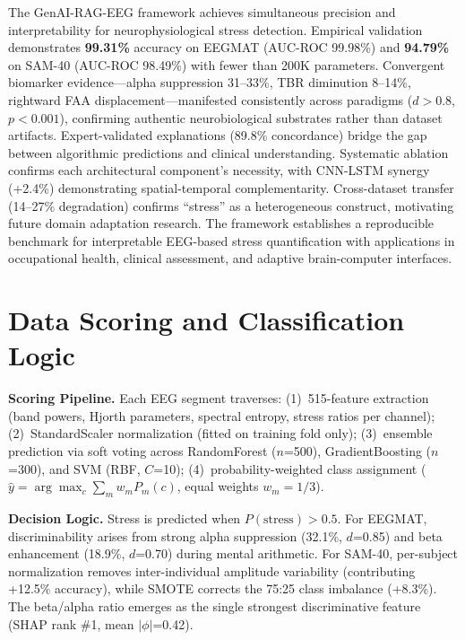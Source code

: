 \documentclass[journal,twoside]{IEEEtran}
\begin{document}
The GenAI-RAG-EEG framework achieves simultaneous precision and interpretability for neurophysiological stress detection. Empirical validation demonstrates \textbf{99.31\%} accuracy on EEGMAT (AUC-ROC 99.98\%) and \textbf{94.79\%} on SAM-40 (AUC-ROC 98.49\%) with fewer than 200K parameters. Convergent biomarker evidence---alpha suppression 31--33\%, TBR diminution 8--14\%, rightward FAA displacement---manifested consistently across paradigms ($d>0.8$, $p<0.001$), confirming authentic neurobiological substrates rather than dataset artifacts. Expert-validated explanations (89.8\% concordance) bridge the gap between algorithmic predictions and clinical understanding. Systematic ablation confirms each architectural component's necessity, with CNN-LSTM synergy (+2.4\%) demonstrating spatial-temporal complementarity. Cross-dataset transfer (14--27\% degradation) confirms ``stress'' as a heterogeneous construct, motivating future domain adaptation research. The framework establishes a reproducible benchmark for interpretable EEG-based stress quantification with applications in occupational health, clinical assessment, and adaptive brain-computer interfaces.

\section*{Data Scoring and Classification Logic}

\noindent\textbf{Scoring Pipeline.} Each EEG segment traverses: (1)~515-feature extraction (band powers, Hjorth parameters, spectral entropy, stress ratios per channel); (2)~StandardScaler normalization (fitted on training fold only); (3)~ensemble prediction via soft voting across RandomForest ($n$=500), GradientBoosting ($n$=300), and SVM (RBF, $C$=10); (4)~probability-weighted class assignment ($\hat{y} = \arg\max_c \sum_m w_m P_m(c)$, equal weights $w_m=1/3$).

\noindent\textbf{Decision Logic.} Stress is predicted when $P(\text{stress}) > 0.5$. For EEGMAT, discriminability arises from strong alpha suppression (32.1\%, $d$=0.85) and beta enhancement (18.9\%, $d$=0.70) during mental arithmetic. For SAM-40, per-subject normalization removes inter-individual amplitude variability (contributing +12.5\% accuracy), while SMOTE corrects the 75:25 class imbalance (+8.3\%). The beta/alpha ratio emerges as the single strongest discriminative feature (SHAP rank \#1, mean $|\phi|$=0.42).
\end{document}
